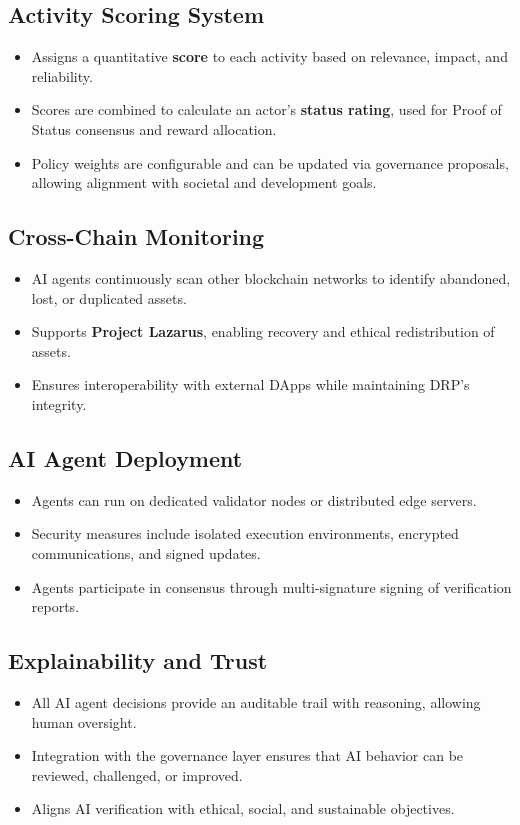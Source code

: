 \documentclass[11pt,a4paper]{article}
\begin{document}
\subsection{Activity Scoring System}
\begin{itemize}
    \item Assigns a quantitative \textbf{score} to each activity based on relevance, impact, and reliability.  
    \item Scores are combined to calculate an actor’s \textbf{status rating}, used for Proof of Status consensus and reward allocation.  
    \item Policy weights are configurable and can be updated via governance proposals, allowing alignment with societal and development goals.  
\end{itemize}

\subsection{Cross-Chain Monitoring}
\begin{itemize}
    \item AI agents continuously scan other blockchain networks to identify abandoned, lost, or duplicated assets.  
    \item Supports \textbf{Project Lazarus}, enabling recovery and ethical redistribution of assets.  
    \item Ensures interoperability with external DApps while maintaining DRP’s integrity.  
\end{itemize}

\subsection{AI Agent Deployment}
\begin{itemize}
    \item Agents can run on dedicated validator nodes or distributed edge servers.  
    \item Security measures include isolated execution environments, encrypted communications, and signed updates.  
    \item Agents participate in consensus through multi-signature signing of verification reports.  
\end{itemize}

\subsection{Explainability and Trust}
\begin{itemize}
    \item All AI agent decisions provide an auditable trail with reasoning, allowing human oversight.  
    \item Integration with the governance layer ensures that AI behavior can be reviewed, challenged, or improved.  
    \item Aligns AI verification with ethical, social, and sustainable objectives.  
\end{itemize}
\end{document}
